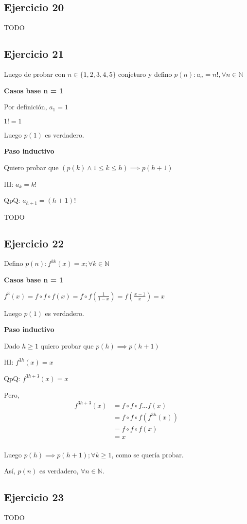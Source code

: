 \subsection{Ejercicio 20}

TODO

\subsection{Ejercicio 21}

Luego de probar con $ n \in \{ 1,2,3,4,5 \} $ conjeturo y defino $ p(n): a_n = n!, \forall n \in \mathbb{N}$

\textbf{Casos base n = 1}

Por definición, $a_1 = 1$

$ 1! = 1$

Luego $ p(1)$ es verdadero.

\textbf{Paso inductivo}

Quiero probar que $(p(k) \wedge 1\leq k \leq h) \implies p(h+1)$

HI: $ a_k = k! $

QpQ: $ a_{h+1} = (h+1)!$

TODO

\subsection{Ejercicio 22}

Defino $ p(n): f^{3k}(x) = x; \forall k \in \mathbb{N} $

\textbf{Casos base n = 1}

$f^{3}(x) = f \circ f \circ f(x) = f \circ f(\frac{1}{1-x}) = f(\frac{x-1}{x}) = x$

Luego $ p(1) $ es verdadero.

\textbf{Paso inductivo}

Dado $ h\geq 1 $ quiero probar que $ p(h) \implies p(h+1) $

HI: $ f^{3h}(x) = x $

QpQ: $ f^{3h+3}(x) = x$

Pero,
\begin{align*}
   f^{3h+3}(x) &= f \circ f \circ f ... f(x) \\
   &= f \circ f \circ f (f^{3h}(x)) \\
   &= f \circ f \circ f (x) \\
   &= x \\
\end{align*}

Luego $p(h) \implies p(h+1); \forall k \geq 1$, como se quería probar.

Así, $p(n)$ es verdadero, $\forall n \in \mathbb{N}$.

\subsection{Ejercicio 23}
TODO


